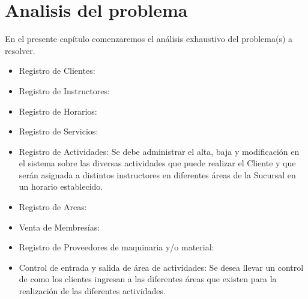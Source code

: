 \chapter*{Analisis del problema}\label{cap.analisisdelproblema}

En el presente cap\'itulo comenzaremos el an\'alisis exhaustivo del problema(s) a resolver. 
\begin{itemize}
	\item Registro de Clientes: 
	\item Registro de Instructores: 
	\item Registro de Horarios:
	\item Registro de Servicios:
	\item Registro de Actividades: Se debe administrar el alta, baja y modificaci\'on en el sistema sobre las diversas actividades que puede realizar el Cliente y que ser\'an asignada a distintos instructores en diferentes \'areas de la Sucursal en un horario establecido.
	\item Registro de Areas:
	\item Venta de Membres\'ias:
	\item Registro de Proveedores de maquinaria y/o material:
	\item Control de entrada y salida de \'area de actividades: Se desea llevar un control de como los clientes ingresan a las diferentes \'areas que existen para la realizaci\'on de las diferentes actividades.
	
\end{itemize}
